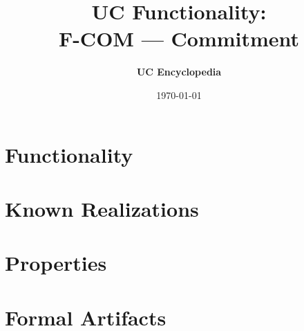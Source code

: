 \documentclass[11pt,a4paper]{article}
\title{\textbf{\Large UC Functionality:}\\[0.2em] \Large F-COM --- Commitment}
\author{\textbf{UC Encyclopedia}}
\date{\today}
\newtheorem{functionality}{Functionality}
\begin{document}
\maketitle

\begin{abstract}
\end{abstract}

\section{Functionality}

%

\section{Known Realizations}


\section{Properties}


\section{Formal Artifacts}

\end{document}

